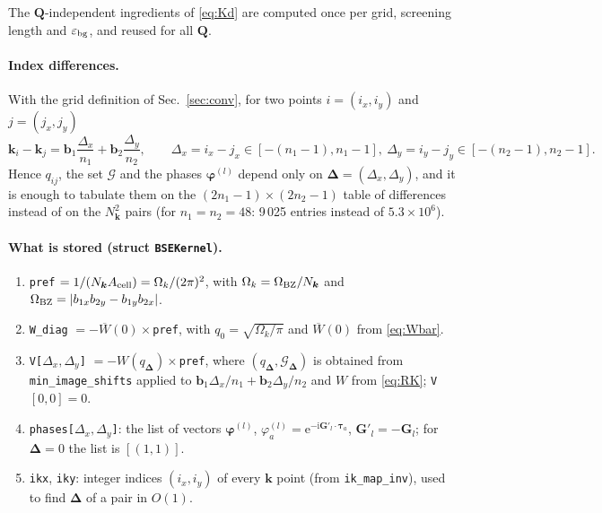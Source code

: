\documentclass[11pt,a4paper]{article}
\newcommand{\ii}{\mathrm{i}}
\newcommand{\ee}{\mathrm{e}}
\newcommand{\kk}{\bm{k}}
\newcommand{\QQ}{\bm{Q}}
\newcommand{\GG}{\bm{G}}
\newcommand{\bb}{\bm{b}}
\newcommand{\ttau}{\bm{\tau}}
\newcommand{\code}[1]{\texttt{#1}}
\newcommand{\Acell}{A_{\rm cell}}
\newcommand{\Nk}{N_{\bm k}}
\newcommand{\Wbar}{\overline{W}(0)}
\begin{document}
The $\QQ$-independent ingredients of \eqref{eq:Kd} are computed once per grid, screening length and $\varepsilon_{\rm bg}$, and reused for all $\QQ$.

\paragraph{Index differences.} With the grid definition of Sec.~\ref{sec:conv}, for two points $i=(i_x,i_y)$ and $j=(j_x,j_y)$
\begin{equation}
\kk_i-\kk_j=\bb_1\frac{\Delta_x}{n_1}+\bb_2\frac{\Delta_y}{n_2},\qquad
\Delta_x=i_x-j_x\in[-(n_1-1),n_1-1],\ \Delta_y=i_y-j_y\in[-(n_2-1),n_2-1].
\end{equation}
Hence $q_{ij}$, the set $\mathcal G$ and the phases $\bm\varphi^{(l)}$ depend only on $\bm\Delta=(\Delta_x,\Delta_y)$, and it is enough to tabulate them on the $(2n_1-1)\times(2n_2-1)$ table of differences instead of on the $\Nk^2$ pairs (for $n_1=n_2=48$: 9\,025 entries instead of $5.3\times10^6$).

\paragraph{What is stored (struct \code{BSEKernel}).}
\begin{enumerate}[leftmargin=*,itemsep=0pt]
\item \code{pref} $=1/(\Nk\Acell)=\Omega_k/(2\pi)^2$, with $\Omega_k=\Omega_{\rm BZ}/\Nk$ and $\Omega_{\rm BZ}=|b_{1x}b_{2y}-b_{1y}b_{2x}|$.
\item \code{W\_diag} $=-\Wbar\times$\code{pref}, with $q_0=\sqrt{\Omega_k/\pi}$ and $\Wbar$ from \eqref{eq:Wbar}.
\item \code{V[$\Delta_x,\Delta_y$]} $=-W(q_{\bm\Delta})\times$\code{pref}, where $(q_{\bm\Delta},\mathcal G_{\bm\Delta})$ is obtained from \code{min\_image\_shifts} applied to $\bb_1\Delta_x/n_1+\bb_2\Delta_y/n_2$ and $W$ from \eqref{eq:RK}; \code{V}$[0,0]=0$.
\item \code{phases[$\Delta_x,\Delta_y$]}: the list of vectors $\bm\varphi^{(l)}$, $\varphi^{(l)}_a=\ee^{-\ii\bm G'_l\cdot\ttau_a}$, $\bm G'_l=-\GG_l$; for $\bm\Delta=0$ the list is $[(1,1)]$.
\item \code{ikx}, \code{iky}: integer indices $(i_x,i_y)$ of every $\kk$ point (from \code{ik\_map\_inv}), used to find $\bm\Delta$ of a pair in $O(1)$.
\end{enumerate}
\end{document}

